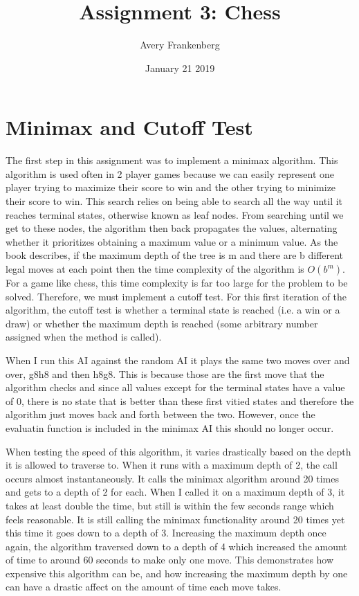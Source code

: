 \documentclass{article}
\title{Assignment 3: Chess}
\author{Avery Frankenberg}
\date{January 21 2019}
\begin{document}
\maketitle

\section{Minimax and Cutoff Test}
The first step in this assignment was to implement a minimax algorithm. This algorithm is used often in 2 player games because we can easily represent one player trying to maximize their score to win and the other trying to minimize their score to win. This search relies on being able to search all the way until it reaches terminal states, otherwise known as leaf nodes. From searching until we get to these nodes, the algorithm then back propagates the values, alternating whether it prioritizes obtaining a maximum value or a minimum value. As the book describes, if the maximum depth of the tree is m and there are b different legal moves at each point then the time complexity of the algorithm is \(O(b^m)\). For a game like chess, this time complexity is far too large for the problem to be solved. Therefore, we must implement a cutoff test. For this first iteration of the algorithm, the cutoff test is whether a terminal state is reached (i.e. a win or a draw) or whether the maximum depth is reached (some arbitrary number assigned when the method is called). 

When I run this AI against the random AI it plays the same two moves over and over, g8h8 and then h8g8. This is because those are the first move that the algorithm checks and since all values except for the terminal states have a value of 0, there is no state that is better than these first vitied states and therefore the algorithm just moves back and forth between the two. However, once the evaluatin function is included in the minimax AI this should no longer occur. 

When testing the speed of this algorithm, it varies drastically based on the depth it is allowed to traverse to. When it runs with a maximum depth of 2, the call occurs almost instantaneously. It calls the minimax algorithm around 20 times and gets to a depth of 2 for each. When I called it on a maximum depth of 3, it takes at least double the time, but still is within the few seconds range which feels reasonable. It is still calling the minimax functionality around 20 times yet this time it goes down to a depth of 3. Increasing the maximum depth once again, the algorithm traversed down to a depth of 4 which increased the amount of time to around 60 seconds to make only one move. This demonstrates how expensive this algorithm can be, and how increasing the maximum depth by one can have a drastic affect on the amount of time each move takes. 
\end{document}
